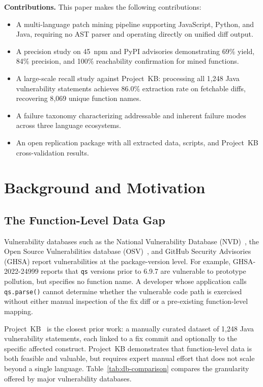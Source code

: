 \documentclass[sigconf,nonacm]{acmart}
\begin{document}
\textbf{Contributions.} This paper makes the following contributions:
\begin{itemize}
    \item A multi-language patch mining pipeline supporting JavaScript,
    Python, and Java, requiring no AST parser and operating directly on
    unified diff output.
    \item A precision study on 45~npm and PyPI advisories demonstrating
    69\% yield, 84\% precision, and 100\% reachability confirmation for
    mined functions.
    \item A large-scale recall study against Project~KB: processing all
    1{,}248 Java vulnerability statements achieves 86.0\% extraction
    rate on fetchable diffs, recovering 8{,}069 unique function names.
    \item A failure taxonomy characterizing addressable and inherent
    failure modes across three language ecosystems.
    \item An open replication package with all extracted data, scripts,
    and Project~KB cross-validation results.
\end{itemize}

\section{Background and Motivation}
\label{sec:background}

\subsection{The Function-Level Data Gap}

Vulnerability databases such as the National Vulnerability Database
(NVD)~\cite{nvd}, the Open Source Vulnerabilities database
(OSV)~\cite{osv}, and GitHub Security Advisories (GHSA) report
vulnerabilities at the package-version level.
For example, GHSA-2022-24999 reports that \texttt{qs} versions prior to
6.9.7 are vulnerable to prototype pollution, but specifies no function name.
A developer whose application calls \texttt{qs.parse()} cannot determine
whether the vulnerable code path is exercised without either manual
inspection of the fix diff or a pre-existing function-level mapping.

Project~KB~\cite{ponta2019projectkb} is the closest prior work: a manually
curated dataset of 1{,}248 Java vulnerability statements, each linked to a
fix commit and optionally to the specific affected construct.
Project~KB demonstrates that function-level data is both feasible and
valuable, but requires expert manual effort that does not scale beyond
a single language.
Table~\ref{tab:db-comparison} compares the granularity offered by major
vulnerability databases.
\end{document}
